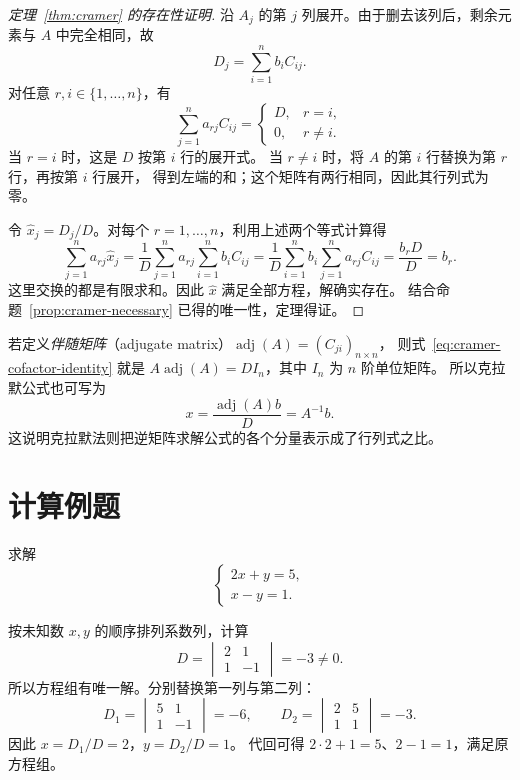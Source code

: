 \documentclass[UTF8,12pt,a4paper,fontset=fandol]{ctexart}
\begin{document}
\begin{proof}[定理~\ref{thm:cramer} 的存在性证明]
沿 $A_j$ 的第 $j$ 列展开。由于删去该列后，剩余元素与 $A$ 中完全相同，故
\begin{equation}
  D_j=\sum_{i=1}^n b_iC_{ij}.
  \label{eq:cramer-cofactor-expansion}
\end{equation}
对任意 $r,i\in\{1,\ldots,n\}$，有
\begin{equation}
  \sum_{j=1}^n a_{rj}C_{ij}
  =\begin{cases}
    D,&r=i,\\
    0,&r\ne i.
  \end{cases}
  \label{eq:cramer-cofactor-identity}
\end{equation}
当 $r=i$ 时，这是 $D$ 按第 $i$ 行的展开式。
当 $r\ne i$ 时，将 $A$ 的第 $i$ 行替换为第 $r$ 行，再按第 $i$ 行展开，
得到左端的和；这个矩阵有两行相同，因此其行列式为零。

令 $\widehat x_j=D_j/D$。对每个 $r=1,\ldots,n$，利用上述两个等式计算得
\[
  \sum_{j=1}^n a_{rj}\widehat x_j
  =\frac1D\sum_{j=1}^n a_{rj}\sum_{i=1}^n b_iC_{ij}
  =\frac1D\sum_{i=1}^n b_i\sum_{j=1}^n a_{rj}C_{ij}
  =\frac{b_rD}{D}=b_r.
\]
这里交换的都是有限求和。因此 $\widehat x$ 满足全部方程，解确实存在。
结合命题~\ref{prop:cramer-necessary} 已得的唯一性，定理得证。
\end{proof}

若定义\emph{伴随矩阵}（adjugate matrix）$\operatorname{adj}(A)=(C_{ji})_{n\times n}$，
则式~\eqref{eq:cramer-cofactor-identity} 就是
$A\operatorname{adj}(A)=DI_n$，其中 $I_n$ 为 $n$ 阶单位矩阵。
所以克拉默公式也可写为
\[
  x=\frac{\operatorname{adj}(A)b}{D}=A^{-1}b.
\]
这说明克拉默法则把逆矩阵求解公式的各个分量表示成了行列式之比。

\section{计算例题}

\begin{example}[二元方程组]
求解
\[
  \begin{cases}2x+y=5,\\x-y=1.\end{cases}
\]
\end{example}

\begin{solve}
按未知数 $x,y$ 的顺序排列系数列，计算
\[
  D=\begin{vmatrix}2&1\\1&-1\end{vmatrix}=-3\ne0.
\]
所以方程组有唯一解。分别替换第一列与第二列：
\[
  D_1=\begin{vmatrix}5&1\\1&-1\end{vmatrix}=-6,\qquad
  D_2=\begin{vmatrix}2&5\\1&1\end{vmatrix}=-3.
\]
因此 $x=D_1/D=2$，$y=D_2/D=1$。
代回可得 $2\cdot2+1=5$、$2-1=1$，满足原方程组。
\end{solve}
\end{document}
